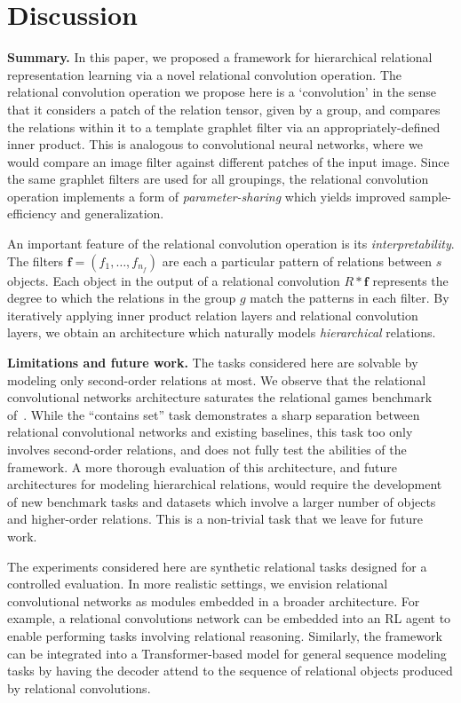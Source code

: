 
\section{Discussion}\label{sec:discussion}

\textbf{Summary.} In this paper, we proposed a framework for hierarchical relational representation learning via a novel relational convolution operation. The relational convolution operation we propose here is a `convolution' in the sense that it considers a patch of the relation tensor, given by a group, and compares the relations within it to a template graphlet filter via an appropriately-defined inner product. This is analogous to convolutional neural networks, where we would compare an image filter against different patches of the input image. Since the same graphlet filters are used for all groupings, the relational convolution operation implements a form of \textit{parameter-sharing} which yields improved sample-efficiency and generalization.

An important feature of the relational convolution operation is its \textit{interpretability}. The filters $\bm{f} = (f_1, \ldots, f_{n_f})$ are each a particular pattern of relations between $s$ objects. Each object in the output of a relational convolution $R \ast \bm{f}$ represents the degree to which the relations in the group $g$ match the patterns in each filter. By iteratively applying inner product relation layers and relational convolution layers, we obtain an architecture which naturally models \textit{hierarchical} relations.

\textbf{Limitations and future work.} The tasks considered here are solvable by modeling only second-order relations at most. We observe that the relational convolutional networks architecture saturates the relational games benchmark of~\citep{shanahanExplicitlyRelationalNeural}. While the ``contains set'' task demonstrates a sharp separation between relational convolutional networks and existing baselines, this task too only involves second-order relations, and does not fully test the abilities of the framework. A more thorough evaluation of this architecture, and future architectures for modeling hierarchical relations, would require the development of new benchmark tasks and datasets which involve a larger number of objects and higher-order relations. This is a non-trivial task that we leave for future work.

The experiments considered here are synthetic relational tasks designed for a controlled evaluation. In more realistic settings, we envision relational convolutional networks as modules embedded in a broader architecture. For example, a relational convolutions network can be embedded into an RL agent to enable performing tasks involving relational reasoning. Similarly, the framework can be integrated into a Transformer-based model for general sequence modeling tasks by having the decoder attend to the sequence of relational objects produced by relational convolutions.